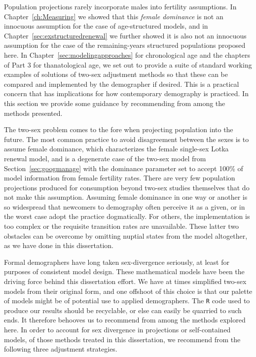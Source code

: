 
Population projections rarely incorporate males into fertility assumptions.
 In Chapter~\ref{ch:Measuring} we showed that this \textit{female dominance} is
 not an innocuous assumption for the case of age-structured models, and in
Chapter~\ref{sec:exstructuredrenewal} we further showed it is also
not an innocuous assumption for the case of the remaining-years structured
populations proposed here. In Chapter~\ref{sec:modelingapproaches} for
chronological age and the chapters of Part 3 for thanatological age, we set out to provide a suite of
standard working examples of solutions of two-sex adjustment methods so that 
these can be compared and implemented by the demographer if desired. This 
is a practical concern that has implications for how
contemporary demography is practiced. In this section we provide some
guidance by recommending from among the methods presented.

The two-sex problem comes to the fore when projecting
population into the future. The most common practice to avoid disagreement between the sexes is to
assume female dominance, which characterizes the female single-sex Lotka
renewal model, and is a degenerate case of the
\citet{goodman1967age} two-sex model from Section~\ref{sec:googmanage} with the 
dominance parameter set to accept 100\% of model information from female
fertility rates. There are very few population projections produced for 
consumption beyond two-sex studies themselves that do not make this assumption. 
Assuming female dominance in one way or another is so widespread that newcomers
to demography often perceive it as a given, or in the worst case adopt the
practice dogmatically. For others, the implementation is too 
complex or the requisite transition rates are unavailable. These latter
two obstacles can be overcome by omitting nuptial states from the model
altogether, as we have done in this dissertation. 

Formal demographers have long taken sex-divergence seriously, at
least for purposes of consistent model design. These mathematical models
have been the driving force behind this dissertation effort. We have at
times simplified two-sex models from their original form, and one offshoot of
this choice is that our palette of models might be of potential use to applied
demographers. The \texttt{R} code used to produce our results should be
recyclable, or else can easily be quarried to such ends. It therefore behooves
us to recommend from among the methods explored here. In order to account for
sex divergence in projections or self-contained models, of those methods treated in this dissertation, 
we recommend from the following three adjustment strategies.

